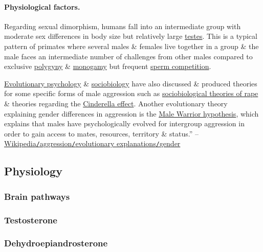 \documentclass[oneside]{book}
\numberwithin{equation}{section}
\begin{document}
\paragraph{Physiological factors.} Regarding sexual dimorphism, humans fall into an intermediate group with moderate sex differences in body size but relatively large \href{https://en.wikipedia.org/wiki/Testes}{testes}. This is a typical pattern of primates where several males \& females live together in a group \& the male faces an intermediate number of challenges from other males compared to exclusive \href{https://en.wikipedia.org/wiki/Polygyny}{polygyny} \& \href{https://en.wikipedia.org/wiki/Monogamy}{monogamy} but frequent \href{https://en.wikipedia.org/wiki/Sperm_competition}{sperm competition}.

\href{https://en.wikipedia.org/wiki/Evolutionary_psychology}{Evolutionary psychology} \& \href{https://en.wikipedia.org/wiki/Sociobiology}{sociobiology} have also discussed \& produced theories for some specific forms of male aggression such as \href{https://en.wikipedia.org/wiki/Sociobiological_theories_of_rape}{sociobiological theories of rape} \& theories regarding the \href{https://en.wikipedia.org/wiki/Cinderella_effect}{Cinderella effect}. Another evolutionary theory explaining gender differences in aggression is the \href{https://en.wikipedia.org/wiki/Male_Warrior_hypothesis}{Male Warrior hypothesis}, which explains that males have psychologically evolved for intergroup aggression in order to gain access to mates, resources, territory \& status.'' -- \href{https://en.wikipedia.org/wiki/Aggression#Gender}{Wikipedia\texttt{/}aggression\texttt{/}evolutionary explanations\texttt{/}gender}

\subsection{Physiology}

\subsubsection{Brain pathways}

\subsubsection{Testosterone}

\subsubsection{Dehydroepiandrosterone}
\end{document}
